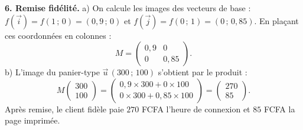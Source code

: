 \documentclass[11pt]{article}
\begin{document}
\begin{exoresolu}
\textbf{6. Remise fidélité.}
a) On calcule les images des vecteurs de base : $f(\vec{i})=f(1\,;\,0)=(0{,}9\,;\,0)$ et $f(\vec{j})=f(0\,;\,1)=(0\,;\,0{,}85)$. En plaçant ces coordonnées en colonnes :
\[ M=\begin{pmatrix} 0{,}9 & 0 \\ 0 & 0{,}85 \end{pmatrix}. \]
b) L'image du panier-type $\vec{u}\,(300\,;\,100)$ s'obtient par le produit :
\[ M\begin{pmatrix} 300 \\ 100 \end{pmatrix}=\begin{pmatrix} 0{,}9\times 300+0\times 100 \\ 0\times 300+0{,}85\times 100 \end{pmatrix}=\begin{pmatrix} 270 \\ 85 \end{pmatrix}. \]
Après remise, le client fidèle paie $270$ FCFA l'heure de connexion et $85$ FCFA la page imprimée.
\end{exoresolu}
\end{document}
